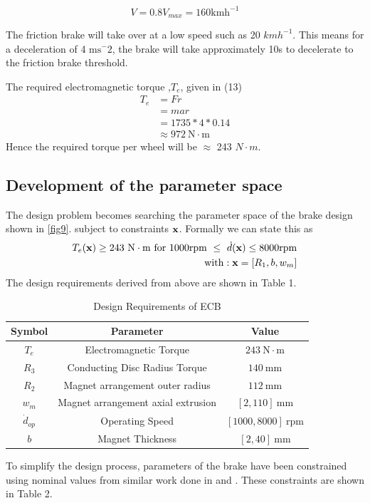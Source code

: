 \documentclass[lettersize,journal]{IEEEtran}
\begin{document}
\begin{equation}
V = 0.8V_{max} = 160\mathrm{kmh^{-1}}
\end{equation}

The friction brake will take over at a low speed such as 20 $kmh^{-1}$\cite{wang_2019_performances}. This means for a deceleration of 4 $\mathrm{ms^-2}$, the brake will take approximately 10s to decelerate to the friction brake threshold. 

The required electromagnetic torque ,$T_e$, given in (13)
\begin{equation}
\begin{split}
T_e &= Fr \\
 & = mar \\
&= 1735*4*0.14 \\
&\approx 972\ \mathrm{N \cdot m}
\end{split}
\end{equation}
Hence the required torque per wheel will be $\approx$ 243 $N\cdot m$.
\subsection{Development of the parameter space}
The design problem becomes searching the parameter space of the brake design shown in \ref{fig9}. subject to constraints $\bold{x}$. Formally we can state this as
\begin{equation}
\begin{split}
T_e(\bold{x}) \geq 243\ \mathrm{N\cdot m}\ \mathrm{for}\ 
1000\mathrm{rpm}\ \leq\ \dot{d}(\bold{x}) \leq 8000\mathrm{rpm} \\ \mathrm{with}: \bold{x} = [R_1,b,w_m]
\end{split}
\end{equation}
The design requirements derived from above are shown in Table 1. 
\begin{table}[!t]
\renewcommand{\arraystretch}{1.3}
\caption{Design Requirements of ECB}
\label{table_example}
\centering
\begin{tabular}{c c c}
\hline
\bfseries Symbol & \bfseries Parameter & \bfseries Value\\
\hline
$T_e$ & Electromagnetic Torque &$243\ \mathrm{N\cdot m}$\\
\hline
$R_3$ & Conducting Disc Radius Torque &$140\ \mathrm{mm}$\\
\hline
$R_2$ & Magnet arrangement outer radius &$112\ \mathrm{mm}$\\
\hline
$w_m$ & Magnet arrangement axial extrusion &$[2,110]\ \mathrm{mm}$\\
\hline
$\dot{d}_{op}$ & Operating Speed &$[1000, 8000]\ \mathrm{rpm}$\\
\hline
$b$ & Magnet Thickness &$[2,40]\ \mathrm{mm}$\\
\hline
\end{tabular}
\end{table}
To simplify the design process, parameters of the brake have been constrained using nominal values from similar work done in \cite{fontchastagner_2018_design} and \cite{oppenheimer_1977_braking}. These constraints are shown in Table 2.
\end{document}
